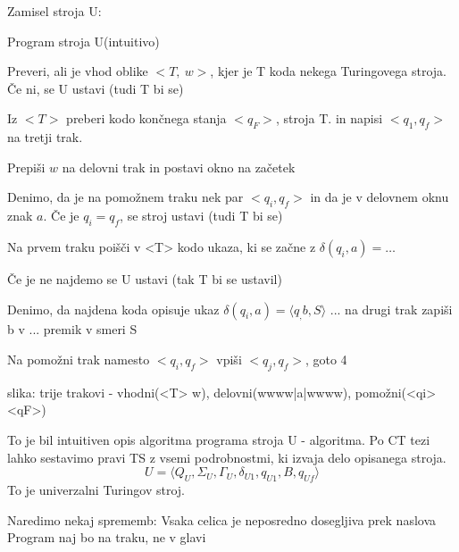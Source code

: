 \documentclass[10pt,a4paper,oneside]{book}
\begin{document}
Zamisel stroja U:


Program stroja U(intuitivo)
\begin{items}
\item Preveri, ali je vhod oblike $<T,\ w>$, kjer je T koda nekega Turingovega stroja. Če ni, se U ustavi (tudi T bi se)
\item Iz $<T>$ preberi kodo končnega stanja $<q_F>$, stroja T. in napisi $<q_1, q_f>$ na tretji trak.
\item Prepiši $w$ na delovni trak in postavi okno na začetek 
\item Denimo, da je na pomožnem traku nek par $<q_i, q_f>$ in da je v delovnem oknu znak $a$. Če je $q_i=q_f$, se stroj ustavi (tudi T bi se)
\item Na prvem traku poišči v <T> kodo ukaza, ki se začne z $\delta(q_i, a)=\dots$
\item Če je ne najdemo se U ustavi (tak T bi se ustavil)
\item Denimo, da najdena koda opisuje ukaz $\delta(q_i, a)=\langle q_, b, S \rangle$ ... na drugi trak zapiši b v ... premik v smeri S
\item Na pomožni trak namesto $<q_i,q_f>$ vpiši $<q_j,q_f>$, goto 4
\end{items}
\fixme slika: trije trakovi - vhodni(<T> w), delovni(wwww|a|wwww), pomožni(<qi><qF>)

To je bil intuitiven opis algoritma programa stroja U - algoritma. Po CT tezi lahko sestavimo pravi TS z vsemi podrobnostmi, ki izvaja delo opisanega stroja.
\[U=\langle Q_U,\Sigma_U,\Gamma_U,\delta_{U1},q_{U1},B,q_{Uf} \rangle  \]
To je univerzalni Turingov stroj.

Naredimo nekaj sprememb:
Vsaka celica je neposredno dosegljiva prek naslova
Program naj bo na traku, ne v glavi
\end{document}
